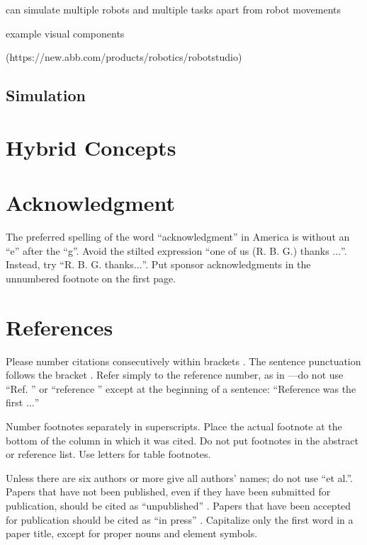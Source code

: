 \documentclass[conference]{IEEEtran}
\begin{document}
        can simulate multiple robots and multiple tasks apart from robot movements

        example visual components

        

        

        (https://new.abb.com/products/robotics/robotstudio)

        

    \subsection{Simulation}

\section{Hybrid Concepts}

\section*{Acknowledgment}

The preferred spelling of the word ``acknowledgment'' in America is without 
an ``e'' after the ``g''. Avoid the stilted expression ``one of us (R. B. 
G.) thanks $\ldots$''. Instead, try ``R. B. G. thanks$\ldots$''. Put sponsor 
acknowledgments in the unnumbered footnote on the first page.

\section*{References}

Please number citations consecutively within brackets \cite{b1}. The 
sentence punctuation follows the bracket \cite{b2}. Refer simply to the reference 
number, as in \cite{b3}---do not use ``Ref. \cite{b3}'' or ``reference \cite{b3}'' except at 
the beginning of a sentence: ``Reference \cite{b3} was the first $\ldots$''

Number footnotes separately in superscripts. Place the actual footnote at 
the bottom of the column in which it was cited. Do not put footnotes in the 
abstract or reference list. Use letters for table footnotes.

Unless there are six authors or more give all authors' names; do not use 
``et al.''. Papers that have not been published, even if they have been 
submitted for publication, should be cited as ``unpublished'' \cite{b4}. Papers 
that have been accepted for publication should be cited as ``in press'' \cite{b5}. 
Capitalize only the first word in a paper title, except for proper nouns and 
element symbols.
\end{document}
